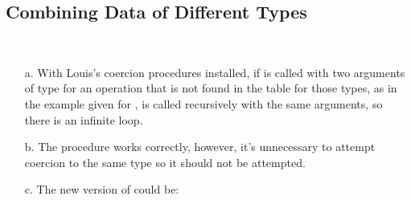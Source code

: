 \subsection{Combining Data of Different Types}

\begin{exe}[2.81]
    \ \vspace{-20pt}
    \begin{itemize}
        \item[a.] With Louis’s coercion procedures installed, if 
             is called with two arguments of type 
             for an operation that is not found in the table for 
            those types, as in the example given for , 
             is called recursively with the same arguments, 
            so there is an infinite loop.
        \item[b.]The   procedure works correctly, however, 
            it’s unnecessary to attempt coercion to the same type so it should 
            not be attempted.
        \item[c.] The new version of  could be:
    \end{itemize}
\end{exe}
